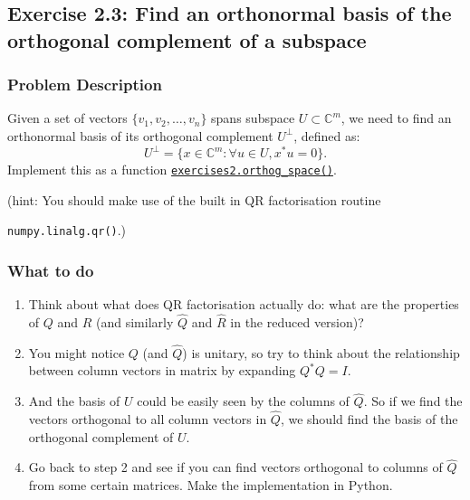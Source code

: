 \subsection*{Exercise 2.3: Find an orthonormal basis of the orthogonal complement of a subspace}
\subsubsection*{Problem Description}%
\label{ssub:problem_description}

Given a set of vectors $ \{v_1, v_2, \ldots, v_n\}$ spans subspace $U \subset \mathbb{C}^{m}$, we need to find an orthonormal basis of its orthogonal complement $U^{\bot}$, defined as:
\[
U^{\bot} = \{x \in \mathbb{C}^{m}: \forall u \in U, x^{*}u = 0\} 
.\] 
Implement this as a function \href{https://comp-lin-alg.github.io/cla_utils.html#cla_utils.exercises2.orthog_space}{\texttt{exercises2.orthog\_space()}}. \medskip

\noindent  
(hint: You should make use of the built in QR factorisation routine

\noindent \texttt{numpy.linalg.qr()}.)

\subsubsection*{What to do}%
\label{ssub:what_to_do}

\begin{enumerate}
  \item Think about what does QR factorisation actually do: what are the properties of $Q$ and $R$  (and similarly $\hat{Q}$ and $\hat{R}$ in the reduced version)?
  \item You might notice $Q$ (and $\hat{Q}$) is unitary, so try to think about the relationship between column vectors in matrix by expanding $Q^*Q = I$.
  \item And the basis of $U$ could be easily seen by the columns of $\hat{Q}$. So if we find the vectors orthogonal to all column vectors in $\hat{Q}$, we should find the basis of the orthogonal complement of $U$.
  \item Go back to step 2 and see if you can find vectors orthogonal to columns of \(\hat{Q}\) from some certain matrices. Make the implementation in Python.
\end{enumerate}

